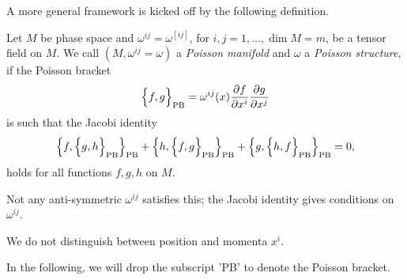 A more general framework is kicked off by the following definition.
\begin{definition}
  Let $M$ be phase space and $\omega^{ij} = \omega^{[ij]}$, for $i, j = 1, \dots, \dim M = m$, be a tensor field on $M$.
  We call $(M, \omega^{ij} = \omega)$ a \emph{Poisson manifold} and $\omega$ a \emph{Poisson structure}, if the Poisson bracket
  \begin{equation}
    \Bigl\{ f, g \Bigr\}_{\text{PB}} = \omega^{ij}(x) \frac{\partial f}{\partial x^{i}} \frac{\partial g}{\partial x^{j}}
  \end{equation}
  is such that the Jacobi identity
  \begin{equation}
    \Bigl\{ f, \Bigl\{ g, h \Bigr\}_{\text{PB}} \Bigr\}_{\text{PB}} + \Bigl\{ h, \Bigl\{ f, g \Bigr\}_{\text{PB}} \Bigr\}_{\text{PB}} + \Bigl\{ g, \Bigl\{ h, f \Bigr\}_{\text{PB}} \Bigr\}_{\text{PB}} = 0,
  \end{equation}
  holds for all functions $f, g, h$ on $M$.
\end{definition}
\begin{leftbar}
  Not any anti-symmetric $\omega^{ij}$ satisfies this; the Jacobi identity gives conditions on $\omega^{ij}$.
\end{leftbar} 
\begin{remark}
  We do not distinguish between position and momenta $x^{i}$.
\end{remark}
In the following, we will drop the subscript 'PB' to denote the Poisson bracket.
